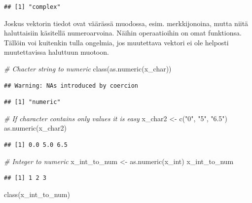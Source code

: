 \documentclass[
]{book}
\newenvironment{Shaded}{\begin{snugshade}}{\end{snugshade}}
\newcommand{\CommentTok}[1]{\textcolor[rgb]{0.56,0.35,0.01}{\textit{#1}}}
\newcommand{\FunctionTok}[1]{\textcolor[rgb]{0.00,0.00,0.00}{#1}}
\newcommand{\NormalTok}[1]{#1}
\newcommand{\OtherTok}[1]{\textcolor[rgb]{0.56,0.35,0.01}{#1}}
\newcommand{\StringTok}[1]{\textcolor[rgb]{0.31,0.60,0.02}{#1}}
\begin{document}
\begin{verbatim}
## [1] "complex"
\end{verbatim}

Joskus vektorin tiedot ovat väärässä muodossa, esim. merkkijonoina, mutta niitä haluttaisiin käsitellä numeroarvoina. Näihin operaatioihin on omat funktionsa. Tällöin voi kuitenkin tulla ongelmia, jos muutettava vektori ei ole helposti muutettavissa haluttuun muotoon.

\begin{Shaded}
\begin{Highlighting}[]
\CommentTok{\# Chacter string to numeric}
\FunctionTok{class}\NormalTok{(}\FunctionTok{as.numeric}\NormalTok{(x\_char))}
\end{Highlighting}
\end{Shaded}

\begin{verbatim}
## Warning: NAs introduced by coercion
\end{verbatim}

\begin{verbatim}
## [1] "numeric"
\end{verbatim}

\begin{Shaded}
\begin{Highlighting}[]
\CommentTok{\# If character contains only values it is easy}
\NormalTok{x\_char2 }\OtherTok{\textless{}{-}} \FunctionTok{c}\NormalTok{(}\StringTok{"0"}\NormalTok{, }\StringTok{"5"}\NormalTok{, }\StringTok{"6.5"}\NormalTok{)}
\FunctionTok{as.numeric}\NormalTok{(x\_char2)}
\end{Highlighting}
\end{Shaded}

\begin{verbatim}
## [1] 0.0 5.0 6.5
\end{verbatim}

\begin{Shaded}
\begin{Highlighting}[]
\CommentTok{\# Integer to numeric}
\NormalTok{x\_int\_to\_num }\OtherTok{\textless{}{-}} \FunctionTok{as.numeric}\NormalTok{(x\_int)}
\NormalTok{x\_int\_to\_num}
\end{Highlighting}
\end{Shaded}

\begin{verbatim}
## [1] 1 2 3
\end{verbatim}

\begin{Shaded}
\begin{Highlighting}[]
\FunctionTok{class}\NormalTok{(x\_int\_to\_num)}
\end{Highlighting}
\end{Shaded}
\end{document}
